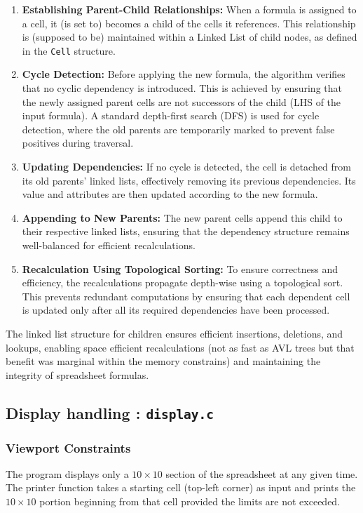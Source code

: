 \documentclass{report}
\begin{document}
\begin{enumerate}
    \item 	\textbf{Establishing Parent-Child Relationships:} When a formula is assigned to a cell, it (is set to) becomes a child of the cells it references. This relationship is (supposed to be) maintained within a Linked List of child nodes, as defined in the \texttt{Cell} structure.
    
    \item 	\textbf{Cycle Detection:} Before applying the new formula, the algorithm verifies that no cyclic dependency is introduced. This is achieved by ensuring that the newly assigned parent cells are not successors of the child (LHS of the input formula). A standard depth-first search (DFS) is used for cycle detection, where the old parents are temporarily marked to prevent false positives during traversal.
    
    \item 	\textbf{Updating Dependencies:} If no cycle is detected, the cell is detached from its old parents' linked lists, effectively removing its previous dependencies. Its value and attributes are then updated according to the new formula.
    
    \item 	\textbf{Appending to New Parents:} The new parent cells append this child to their respective linked lists, ensuring that the dependency structure remains well-balanced for efficient recalculations.
    
    \item 	\textbf{Recalculation Using Topological Sorting:} To ensure correctness and efficiency, the recalculations propagate depth-wise using a topological sort. This prevents redundant computations by ensuring that each dependent cell is updated only after all its required dependencies have been processed.
\end{enumerate}

The linked list structure for children ensures efficient insertions, deletions, and lookups, enabling space efficient recalculations (not as fast as AVL trees but that benefit was marginal within the memory constrains) and maintaining the integrity of spreadsheet formulas.

\subsection*{Display handling : \texttt{display.c}}
\subsubsection*{Viewport Constraints}
The program displays only a \(10 \times 10\) section of the spreadsheet at any given time. The printer function takes a starting cell (top-left corner) as input and prints the \(10 \times 10\) portion beginning from that cell provided the limits are not exceeded. 
\end{document}
